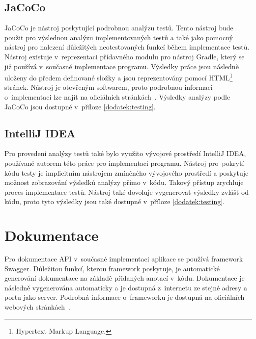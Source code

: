     \subsection{JaCoCo}\label{resere:testovani:jacoco}
        JaCoCo je nástroj poskytující podrobnou analýzu testů. Tento nástroj bude použit pro výslednou analýzu implementovaných testů a také jako pomocný nástroj pro nalezení důležitých neotestovaných funkcí během implementace testů. Nástroj existuje v~reprezentaci přídavného modulu pro nástroj Gradle, který se již používá v~současné implementace programu. Výsledky práce jsou následně uloženy do předem definované složky a jsou reprezentovány pomocí HTML\footnote{Hypertext Markup Language.} stránek. Nástroj je otevřeným softwarem, proto podrobnou informaci o~implementaci lze najít na oficiálních stránkách~\cite{jacoco-implementation}. Výsledky analýzy podle JaCoCo jsou dostupné v~příloze \ref{dodatek:testing}.
        
    \subsection{IntelliJ IDEA}\label{resere:testovani:intellij-idea}
        Pro provedení analýzy testů také bylo využito vývojové prostředí IntelliJ IDEA, používané autorem této práce pro implementaci programu. Nástroj pro~pokrytí kódu testy je implicitním nástrojem zmíněného vývojového prostředí a poskytuje možnost zobrazování výsledků analýzy přímo v~kódu. Takový přístup zrychluje proces implementace testů. Nástroj také dovoluje vygenerovat výsledky zvlášť od kódu, proto tyto výsledky jsou také dostupné v~příloze \ref{dodatek:testing}.


\section{Dokumentace}\label{resere:dokumentace}
    Pro dokumentace API v~současné implementaci aplikace se používá framework Swagger. Důležitou funkcí, kterou framework poskytuje, je automatické generování dokumentace na základě přidaných anotací v~kódu. Dokumentace je následně vygenerována automaticky a je dostupná z~internetu ze stejné adresy a portu jako server. Podrobná informace o~frameworku je dostupná na oficiálních webových stránkách~\cite{swagger-doc}.
    

